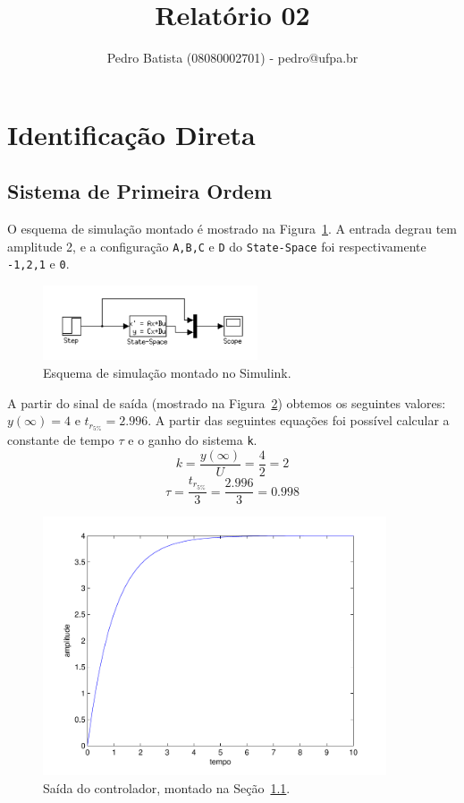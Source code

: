 \documentclass[a4paper]{article}
\title{Relatório 02}
\author{Pedro Batista (08080002701) - pedro@ufpa.br}
\begin{document}
\maketitle

\section{Identificação Direta}

\subsection{Sistema de Primeira Ordem}\label{sec:exp1}
O esquema de simulação montado é mostrado na Figura~\ref{fig:exp}. A entrada degrau
tem amplitude 2, e a configuração \verb-A,B,C- e \verb-D- do \verb.State-Space. foi respectivamente \verb.-1,2,1. e \verb.0..

\begin{figure}[h]
   \centering
   \includegraphics[width=2.5in]{exp}
   \caption{Esquema de simulação montado no Simulink.}
   \label{fig:exp}
\end{figure}

A partir do sinal de saída (mostrado na Figura~\ref{fig:exp1_simulado}) obtemos os seguintes valores:
$y(\infty)=4$ e $t_{r_{5\%}}=2.996$. A partir das seguintes equações foi possível calcular a constante
de tempo $\tau$ e o ganho do sistema \verb-k-.
$$k=\frac{y(\infty)}{U}=\frac{4}{2}=2$$
$$\tau=\frac{t_{r_{5\%}}}{3}=\frac{2.996}{3}=0.998$$

\begin{figure}[h]
   \centering
   \includegraphics[width=4in]{exp1_simulado}
   \caption{Saída do controlador, montado na Seção~\ref{sec:exp1}.}
   \label{fig:exp1_simulado}
\end{figure}
\end{document}
